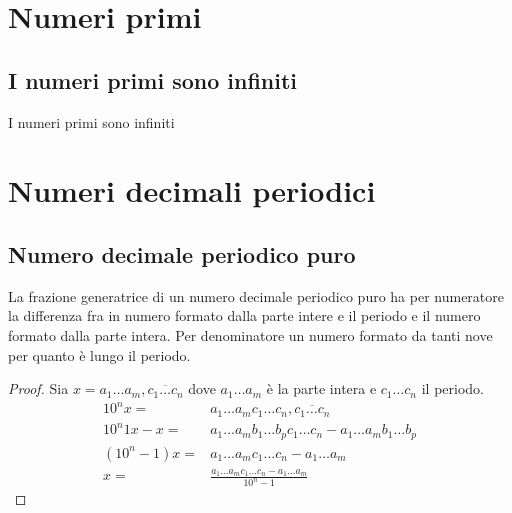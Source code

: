 \chapter{Numeri primi}
\section{I numeri primi sono infiniti}
\begin{thm}\label{thm:numeriprimiinfiniti1}
I numeri primi sono infiniti
\end{thm}
\chapter{Numeri decimali periodici}
\section{Numero decimale periodico puro}
\begin{thm}
	La frazione generatrice di un numero decimale periodico puro ha per numeratore la differenza fra in numero formato dalla parte intere e il periodo e il numero formato dalla parte intera. Per denominatore un numero formato da tanti nove per quanto è lungo il periodo.  
\end{thm}
\begin{proof}
	Sia $x=a_1\dots a_m,\overline{c_1\dots c_n}$ dove $a_1\dots a_m$ è la parte intera e $c_1\dots c_n$ il periodo. 
	\begin{align*}
	10^nx=&a_1\dots a_m c_1\dots c_n,\overline{c_1\dots c_n}\\
	10^n1x-x=&a_1\dots a_m b_1\dots b_p c_1\dots c_n-a_1\dots a_m b_1\dots b_p\\
	(10^n-1)x=&a_1\dots a_m c_1\dots c_n-a_1\dots a_m\\
	x=&\frac{a_1\dots a_m c_1\dots c_n-a_1\dots a_m}{10^n-1}
	\end{align*}
\end{proof}
